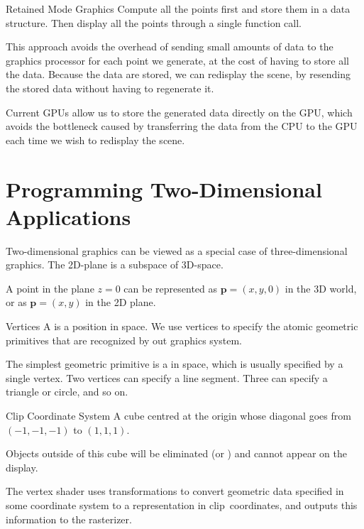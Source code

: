 \documentclass[../notes.tex]{subfiles}
\begin{document}
      \begin{definition}{Retained Mode Graphics}
        Compute all the points first and store them in a data structure.
        Then display all the points through a single function call.

        This approach avoids the overhead of sending small amounts of data to the graphics
        processor for each point we generate,
        at the cost of having to store all the data.
        Because the data are stored, we can redisplay the scene, by resending the stored data
        without having to regenerate it.

        Current GPUs allow us to store the generated data directly on the GPU,
        which avoids the bottleneck caused by transferring the data from the CPU to the GPU
        each time we wish to redisplay the scene.
      \end{definition}

    \section{Programming Two-Dimensional Applications}
      Two-dimensional graphics can be viewed as a special case of three-dimensional graphics.
      The 2D-plane is a subspace of 3D-space.

      A point in the plane $z = 0$ can be represented as $\mathbf{p} = (x, y, 0)$ in the 3D world,
      or as $\mathbf{p} = (x, y)$ in the 2D plane.

      \begin{sidenote}{Vertices}
        A  is a position in space.
        We use vertices to specify the atomic geometric primitives that are recognized
        by out graphics system.

        The simplest geometric primitive is a  in space,
        which is usually specified by a single vertex.
        Two vertices can specify a line segment.
        Three can specify a triangle or circle,
        and so on.
      \end{sidenote}

      \begin{definition}{Clip Coordinate System}
        A cube centred at the origin whose diagonal goes from $(-1, -1, -1)$ to $(1, 1, 1)$.

        Objects outside of this cube will be eliminated (or ) and cannot appear
        on the display.

        The vertex shader uses transformations to convert geometric data
        specified in some coordinate system to a representation in clip~coordinates,
        and outputs this information to the rasterizer.
      \end{definition}
\end{document}
